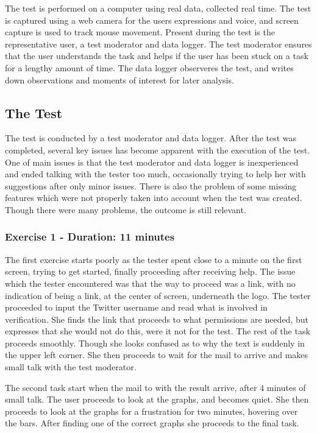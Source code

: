 The test is performed on a computer using real data, collected real time. The
test is captured using a web camera for the users expressions and voice, and
screen capture is used to track mouse movement. Present during the test is the
representative user, a test moderator and data logger. The test moderator
ensures that the user understands the task and helps if the user has been stuck
on a task for a lengthy amount of time. The data logger observeres the test,
and writes down observations and moments of interest for later analysis.

\subsection{The Test}\label{subsec:UXTest}
The test is conducted by a test moderator and data logger. After the test was
completed, several key issues has become apparent with the execution of the
test. One of main issues is that the test moderator and data logger is
inexperienced and ended talking with the tester too much, occasionally trying
to help her with suggestions after only minor issues. There is also the problem
of some missing features which were not properly taken into account when the
test was created. Though there were many problems, the outcome is still
relevant.

\subsubsection{Exercise 1 - Duration: 11 minutes}
The first exercise starts poorly as the tester spent close to a minute on the
first screen, trying to get started, finally proceeding after receiving help.
The issue which the tester encountered was that the way to proceed was a link,
with no indication of being a link, at the center of screen, underneath the
logo. The tester proceeded to input the Twitter username and read what is
involved in verification. She finds the link that proceeds to what permissions
are needed, but expresses that she would not do this, were it not for the test.
The rest of the task proceeds smoothly. Though she looks confused as to why the
text is suddenly in the upper left corner. She then proceeds to wait for the
mail to arrive and makes small talk with the test moderator.\nl

The second task start when the mail to with the result arrive, after 4 minutes
of small talk. The user proceeds to look at the graphs, and becomes quiet. She
then proceeds to look at the graphs for a frustration for two minutes, hovering
over the bars. After finding one of the correct graphs she proceeds to the final
task.\nl

